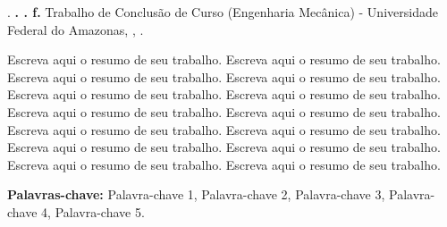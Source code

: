 \singlespacing %

\noindent \CITACAOAUTOR. \textbf{\TITULO. \ANO. \pageref{LastPage}f.} Trabalho de Conclusão de Curso (Engenharia Mecânica) - Universidade Federal do Amazonas, \LOCAL, \ANOD.  

\vspace{0.5 cm}

\onehalfspacing %


\noindent Escreva aqui o resumo de seu trabalho. Escreva aqui o resumo de seu trabalho. Escreva aqui o resumo de seu trabalho. Escreva aqui o resumo de seu trabalho. Escreva aqui o resumo de seu trabalho. Escreva aqui o resumo de seu trabalho. Escreva aqui o resumo de seu trabalho. Escreva aqui o resumo de seu trabalho. Escreva aqui o resumo de seu trabalho. Escreva aqui o resumo de seu trabalho. Escreva aqui o resumo de seu trabalho. Escreva aqui o resumo de seu trabalho. Escreva aqui o resumo de seu trabalho. Escreva aqui o resumo de seu trabalho.  

\noindent \textbf{Palavras-chave:} Palavra-chave 1, Palavra-chave 2, Palavra-chave 3, Palavra-chave 4, Palavra-chave 5.

